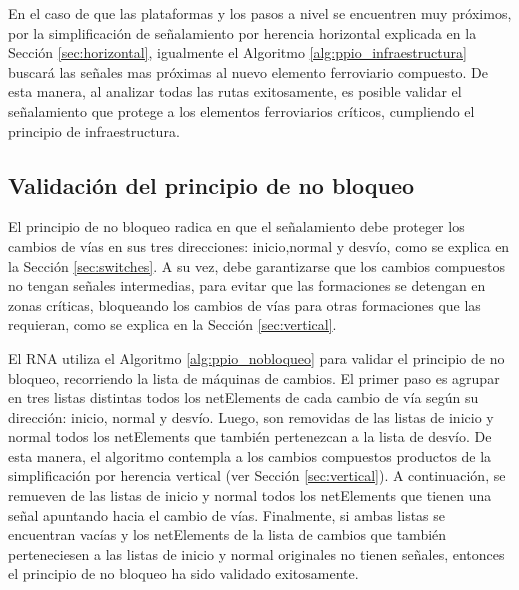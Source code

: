		En el caso de que las plataformas y los pasos a nivel se encuentren muy próximos, por la simplificación de señalamiento por herencia horizontal explicada en la Sección \ref{sec:horizontal}, igualmente el Algoritmo \ref{alg:ppio_infraestructura} buscará las señales mas próximas al nuevo elemento ferroviario compuesto. De esta manera, al analizar todas las rutas exitosamente, es posible validar el señalamiento que protege a los elementos ferroviarios críticos, cumpliendo el principio de infraestructura.
		
	\subsection{Validación del principio de no bloqueo}
		
		El principio de no bloqueo radica en que el señalamiento debe proteger los cambios de vías en sus tres direcciones: inicio,normal y desvío, como se explica en la Sección \ref{sec:switches}. A su vez, debe garantizarse que los cambios compuestos no tengan señales intermedias, para evitar que las formaciones se detengan en zonas críticas, bloqueando los cambios de vías para otras formaciones que las requieran, como se explica en la Sección \ref{sec:vertical}.
		
		El RNA utiliza el Algoritmo \ref{alg:ppio_nobloqueo} para validar el principio de no bloqueo, recorriendo la lista de máquinas de cambios. El primer paso es agrupar en tres listas distintas todos los netElements de cada cambio de vía según su dirección: inicio, normal y desvío. Luego, son removidas de las listas de inicio y normal todos los netElements que también pertenezcan a la lista de desvío. De esta manera, el algoritmo contempla a los cambios compuestos productos de la simplificación por herencia vertical (ver Sección \ref{sec:vertical}). A continuación, se remueven de las listas de inicio y normal todos los netElements que tienen una señal apuntando hacia el cambio de vías. Finalmente, si ambas listas se encuentran vacías y los netElements de la lista de cambios que también perteneciesen a las listas de inicio y normal originales no tienen señales, entonces el principio de no bloqueo ha sido validado exitosamente.
		
